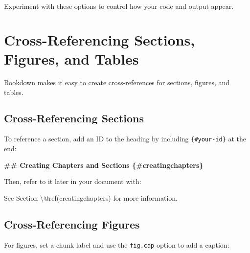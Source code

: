 \documentclass[
]{book}
\newenvironment{Shaded}{\begin{snugshade}}{\end{snugshade}}
\newcommand{\FunctionTok}[1]{\textcolor[rgb]{0.13,0.29,0.53}{\textbf{#1}}}
\newcommand{\NormalTok}[1]{#1}
\newcommand{\SpecialCharTok}[1]{\textcolor[rgb]{0.81,0.36,0.00}{\textbf{#1}}}
\theoremstyle{definition}
\theoremstyle{definition}
\theoremstyle{definition}
\theoremstyle{definition}
\theoremstyle{remark}
\begin{document}
Experiment with these options to control how your code and output appear.

\section{Cross-Referencing Sections, Figures, and Tables}\label{cross-referencing-sections-figures-and-tables}

Bookdown makes it easy to create cross-references for sections, figures, and tables.

\subsection{Cross-Referencing Sections}\label{cross-referencing-sections}

To reference a section, add an ID to the heading by including \texttt{\{\#your-id\}} at the end:

\begin{Shaded}
\begin{Highlighting}[]
\FunctionTok{\#\# Creating Chapters and Sections \{\#creatingchapters\}}
\end{Highlighting}
\end{Shaded}

Then, refer to it later in your document with:

\begin{Shaded}
\begin{Highlighting}[]
\NormalTok{See Section \textbackslash{}@ref(creatingchapters) for more information.}
\end{Highlighting}
\end{Shaded}

\subsection{Cross-Referencing Figures}\label{cross-referencing-figures}

For figures, set a chunk label and use the \texttt{fig.cap} option to add a caption:

\begin{Shaded}
\end{Shaded}
\end{document}
